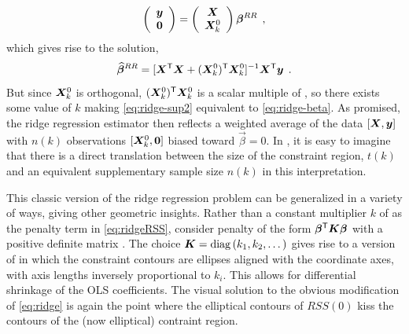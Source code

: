 \begin{equation} \label{eq:ridge-sup1}
\left(
\begin{array}{c} \bm{y} \\ \bm{0} \end{array}
\right)
=
\left(
\begin{array}{c} \bm{X} \\ \bm{X}_k^0 \end{array}
\right)
\bm{\beta}^{RR} \:\: ,
\end{equation}
which gives rise to the solution,
\begin{equation} \label{eq:ridge-sup2}
\widehat{\bm{\beta}}^{RR} = [\bm{X}^\mathsf{T} \bm{X} + (\bm{X}_k^0)^\mathsf{T} \bm{X}_k^0]^{-1} \bm{X}^\mathsf{T} \bm{y} \:\: .
\end{equation}
But since $\bm{X}_k^0$ is orthogonal, $(\bm{X}_k^0)^\mathsf{T} \bm{X}_k^0$ is a scalar multiple of , so there
exists some value of $k$ making \eqref{eq:ridge-sup2} equivalent to \eqref{eq:ridge-beta}.  As promised, the
ridge regression estimator then reflects a weighted average of the data $[\bm{X}, \bm{y}]$ with $n(k)$ observations
$[\bm{X}_k^0, \bm{0}]$ 
biased toward $\vec{\beta}=0$. In , it is easy to imagine that there is a direct translation between
the size of the constraint region, $t(k)$ and an equivalent supplementary sample size $n(k)$ in this interpretation.


This classic version of the ridge regression problem can be generalized in a variety of ways, giving other geometric
insights.  Rather than a constant multiplier $k$ of \vec{\beta}\trans \vec{\beta} as the penalty term in \eqref{eq:ridgeRSS},
consider penalty of the form $\bm{\beta}^\mathsf{T} \bm{K} \bm{\beta}$ with
a positive definite matrix . 
The choice $\bm{K} = \mathrm{diag}\, (k_1, k_2, \dots)$ gives rise to a version of
 in which the constraint contours are ellipses aligned with the coordinate axes, with
axis lengths inversely proportional to $k_i$.  This allows for differential shrinkage of the OLS coefficients.
The visual solution to the obvious modification of \eqref{eq:ridge} is again the point where the elliptical
contours of $RSS(0)$ kiss the contours of the (now elliptical) contraint region.



